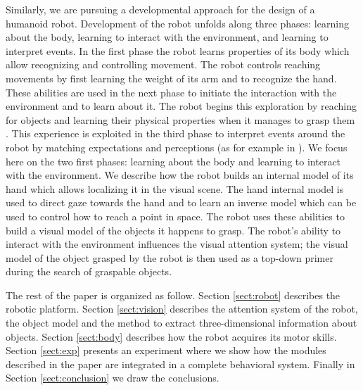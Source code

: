 Similarly, we are pursuing a developmental approach for the design of a humanoid robot. Development of the robot unfolds along three phases: learning about the body, learning to interact with the environment, and learning to interpret events. In the first phase the robot learns properties of its body which allow recognizing and controlling movement. The robot controls reaching movements by first learning the weight of its arm and to recognize the hand. These abilities are used in the next phase to initiate the interaction with the environment and to learn about it. The robot begins this exploration by reaching for objects and learning their physical properties when it manages to grasp them \cite{natale04learning,natale05exploring,torres-jara05tapping}. 
This experience is exploited in the third phase to interpret events around the robot by matching expectations and perceptions (as for example in \cite{metta03early}). We focus here on the two first phases: learning about the body and learning to interact with the environment. We describe how the robot builds an internal model of its hand which allows localizing it in the visual scene. The hand internal model is used to direct gaze towards the hand and to learn an inverse model which can be used to control how to reach a point in space. The robot uses these abilities to build a visual model of the objects it happens to grasp. The robot's ability to interact with the environment influences the visual attention system; the visual model of the object grasped by the robot is then used as a top-down primer during the search of graspable objects.

The rest of the paper is organized as follow. Section \ref{sect:robot} describes the robotic platform. Section \ref{sect:vision} describes the attention system of the robot, the object model and the method to extract three-dimensional information about objects. Section \ref{sect:body} describes how the robot acquires its motor skills. Section \ref{sect:exp} presents an experiment where we show how the modules described in the paper are integrated in a complete behavioral system. Finally in Section \ref{sect:conclusion} we draw the conclusions.
